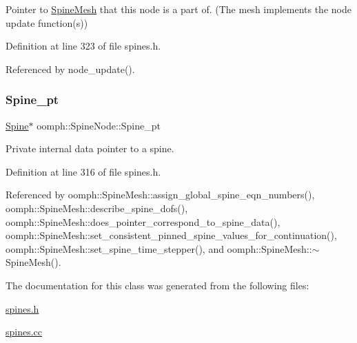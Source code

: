 Pointer to \hyperlink{classoomph_1_1SpineMesh}{Spine\+Mesh} that this node is a part of. (The mesh implements the node update function(s)) 



Definition at line 323 of file spines.\+h.



Referenced by node\+\_\+update().

\mbox{\label{classoomph_1_1SpineNode_aa37f2daad3dddb01e58ecec5d9304cd0}} 
\subsubsection{\texorpdfstring{Spine\+\_\+pt}{Spine\_pt}}
{\footnotesize\ttfamily \hyperlink{classoomph_1_1Spine}{Spine}$\ast$ oomph\+::\+Spine\+Node\+::\+Spine\+\_\+pt\hspace{0.3cm}{\ttfamily [private]}}



Private internal data pointer to a spine. 



Definition at line 316 of file spines.\+h.



Referenced by oomph\+::\+Spine\+Mesh\+::assign\+\_\+global\+\_\+spine\+\_\+eqn\+\_\+numbers(), oomph\+::\+Spine\+Mesh\+::describe\+\_\+spine\+\_\+dofs(), oomph\+::\+Spine\+Mesh\+::does\+\_\+pointer\+\_\+correspond\+\_\+to\+\_\+spine\+\_\+data(), oomph\+::\+Spine\+Mesh\+::set\+\_\+consistent\+\_\+pinned\+\_\+spine\+\_\+values\+\_\+for\+\_\+continuation(), oomph\+::\+Spine\+Mesh\+::set\+\_\+spine\+\_\+time\+\_\+stepper(), and oomph\+::\+Spine\+Mesh\+::$\sim$\+Spine\+Mesh().



The documentation for this class was generated from the following files\+:\begin{DoxyCompactItemize}
\item 
\hyperlink{spines_8h}{spines.\+h}\item 
\hyperlink{spines_8cc}{spines.\+cc}\end{DoxyCompactItemize}
